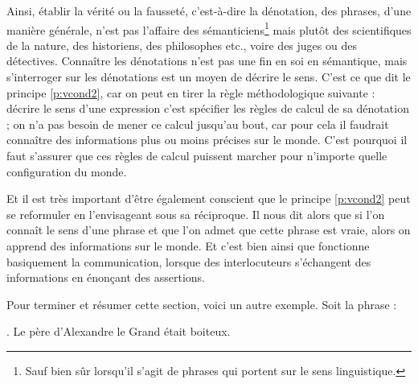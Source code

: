 Ainsi, établir la vérité ou la fausseté, c'est-à-dire la dénotation,
des phrases, d'une manière générale, n'est pas l'affaire des
sémanticiens\footnote{Sauf bien sûr lorsqu'il s'agit de phrases qui
portent sur le sens linguistique.}  mais plutôt des scientifiques de
la nature, des
historiens, des philosophes etc., voire des juges ou des détectives.
Connaître les dénotations n'est pas une fin en soi en sémantique, mais
s'interroger sur les dénotations est un moyen de décrire le sens.
C'est ce que dit le principe \ref{p:vcond2}, car on peut en tirer la
règle méthodologique suivante : décrire le sens d'une expression c'est
spécifier les règles de calcul de sa dénotation ; on n'a pas besoin de
mener ce calcul jusqu'au bout, car pour cela il faudrait connaître des
informations plus ou moins précises sur le monde. C'est pourquoi il
faut s'assurer que ces règles de calcul puissent marcher pour
n'importe quelle configuration du monde.

Et il est très important d'être également conscient que le principe \ref{p:vcond2} peut se reformuler en l'envisageant sous sa réciproque. Il nous dit alors que si l'on connaît le sens d'une phrase et que l'on admet que cette phrase est vraie, alors on apprend des informations sur le monde. Et c'est bien ainsi que fonctionne basiquement la communication, lorsque des interlocuteurs s'échangent des informations en énonçant des assertions.


Pour terminer et résumer cette section, voici un autre exemple.  Soit la
phrase :

\ex.  \label{x:Alex}
Le père d'Alexandre le Grand était boiteux.


